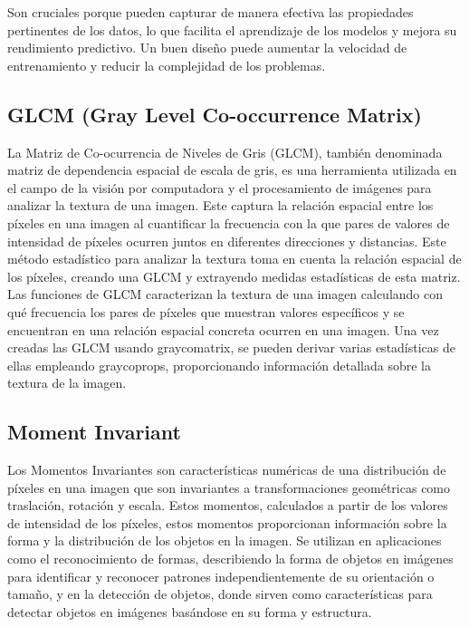 Son cruciales porque pueden capturar de manera efectiva las propiedades pertinentes de los datos, lo que facilita el aprendizaje de los modelos y mejora su rendimiento predictivo. Un buen diseño puede aumentar la velocidad de entrenamiento y reducir la complejidad de los problemas.


\subsection{GLCM (Gray Level Co-occurrence Matrix)}

La Matriz de Co-ocurrencia de Niveles de Gris (GLCM), también denominada matriz de dependencia espacial de escala de gris, es una herramienta utilizada en el campo de la visión por computadora y el procesamiento de imágenes para analizar la textura de una imagen. Este captura la relación espacial entre los píxeles en una imagen al cuantificar la frecuencia con la que pares de valores de intensidad de píxeles ocurren juntos en diferentes direcciones y distancias. Este método estadístico para analizar la textura toma en cuenta la relación espacial de los píxeles, creando una GLCM y extrayendo medidas estadísticas de esta matriz. Las funciones de GLCM caracterizan la textura de una imagen calculando con qué frecuencia los pares de píxeles que muestran valores específicos y se encuentran en una relación espacial concreta ocurren en una imagen. Una vez creadas las GLCM usando graycomatrix, se pueden derivar varias estadísticas de ellas empleando graycoprops, proporcionando información detallada sobre la textura de la imagen.
\parencite{mathworksAnxE1lisisTextura}

\subsection{Moment Invariant}

Los Momentos Invariantes son características numéricas de una distribución de píxeles en una imagen que son invariantes a transformaciones geométricas como traslación, rotación y escala. Estos momentos, calculados a partir de los valores de intensidad de los píxeles, estos momentos proporcionan información sobre la forma y la distribución de los objetos en la imagen. Se utilizan en aplicaciones como el reconocimiento de formas, describiendo la forma de objetos en imágenes para identificar y reconocer patrones independientemente de su orientación o tamaño, y en la detección de objetos, donde sirven como características para detectar objetos en imágenes basándose en su forma y estructura.


